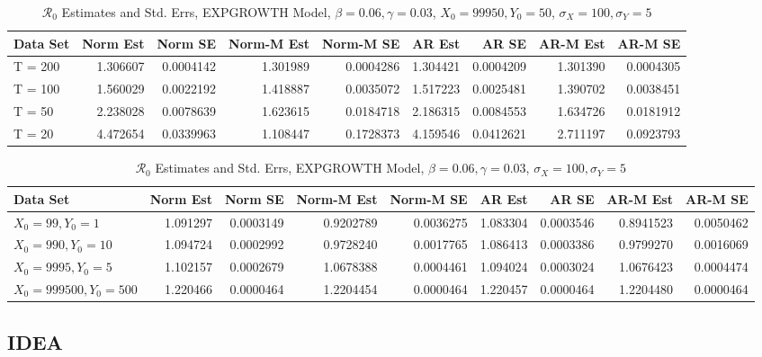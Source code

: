 \documentclass[12pt]{article}
\newcommand{\rr}{\ensuremath{\mathcal{R}_0}}
\begin{document}
\begin{table}[H]
	
	\caption{\label{tab:}$\rr$ Estimates and Std. Errs, EXPGROWTH Model,
		$\beta = 0.06, \gamma = 0.03$, $X_0 = 99950, Y_0 = 50$, $\sigma_X = 100, \sigma_Y = 5$}
	\centering
	\begin{tabular}[t]{l|r|r|r|r|r|r|r|r}
		\hline
		Data Set & Norm Est & Norm SE & Norm-M Est & Norm-M SE & AR Est & AR SE & AR-M Est & AR-M SE\\
		\hline
		T = 200 & 1.306607 & 0.0004142 & 1.301989 & 0.0004286 & 1.304421 & 0.0004209 & 1.301390 & 0.0004305\\
		\hline
		T = 100 & 1.560029 & 0.0022192 & 1.418887 & 0.0035072 & 1.517223 & 0.0025481 & 1.390702 & 0.0038451\\
		\hline
		T = 50 & 2.238028 & 0.0078639 & 1.623615 & 0.0184718 & 2.186315 & 0.0084553 & 1.634726 & 0.0181912\\
		\hline
		T = 20 & 4.472654 & 0.0339963 & 1.108447 & 0.1728373 & 4.159546 & 0.0412621 & 2.711197 & 0.0923793\\
		\hline
	\end{tabular}
\end{table}

\begin{table}[H]
	
	\caption{\label{tab:}$\rr$ Estimates and Std. Errs, EXPGROWTH Model,
		$\beta = 0.06, \gamma = 0.03$, $\sigma_X = 100, \sigma_Y = 5$}
	\centering
	\begin{tabular}[t]{l|r|r|r|r|r|r|r|r}
		\hline
		Data Set & Norm Est & Norm SE & Norm-M Est & Norm-M SE & AR Est & AR SE & AR-M Est & AR-M SE\\
		\hline
		$X_0 = 99, Y_0 = 1$ & 1.091297 & 0.0003149 & 0.9202789 & 0.0036275 & 1.083304 & 0.0003546 & 0.8941523 & 0.0050462\\
		\hline
		$X_0 = 990, Y_0 = 10$ & 1.094724 & 0.0002992 & 0.9728240 & 0.0017765 & 1.086413 & 0.0003386 & 0.9799270 & 0.0016069\\
		\hline
		$X_0 = 9995, Y_0 = 5$ & 1.102157 & 0.0002679 & 1.0678388 & 0.0004461 & 1.094024 & 0.0003024 & 1.0676423 & 0.0004474\\
		\hline
		$X_0 = 999500, Y_0 = 500$ & 1.220466 & 0.0000464 & 1.2204454 & 0.0000464 & 1.220457 & 0.0000464 & 1.2204480 & 0.0000464\\
		\hline
	\end{tabular}
\end{table}

\subsection{IDEA}
\end{document}
